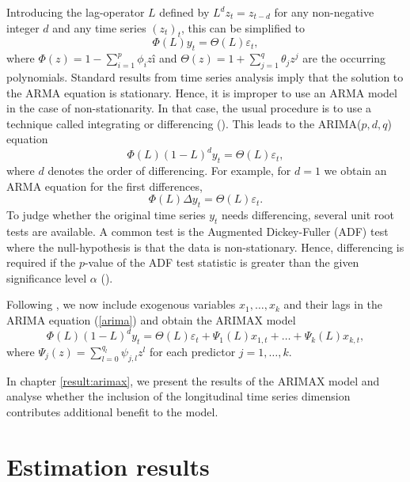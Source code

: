 \documentclass[a4paper, 11pt]{scrreprt}
\begin{document}
Introducing the lag-operator $L$ defined by $L^d z_t = z_{t-d}$ for any non-negative integer $d$ and any time series $(z_t)_t$, this can be simplified to
\begin{equation}
\Phi(L) y_t = \Theta(L) \varepsilon_t,
\end{equation}
where $\Phi(z) = 1 - \sum_{i=1}^p \phi_i zî$ and $\Theta(z) = 1 + \sum_{j=1}^q \theta_j z^j$ are the occurring polynomials.
Standard results from time series analysis imply that the solution to the ARMA equation is stationary. Hence, it is improper to use an ARMA model in the case of non-stationarity. 
In that case, the usual procedure is to use a technique called integrating or differencing (\textcite[chapter 13.1]{kreiss2006zeitreihenanalysis}). This leads to the ARIMA($p,d,q$) equation
\begin{equation}\label{arima}
\Phi(L) (1-L)^d y_t = \Theta(L) \varepsilon_t,
\end{equation}
where $d$ denotes the order of differencing. For example, for $d=1$ we obtain an ARMA equation for the first differences,
\begin{equation}
\Phi(L) \Delta y_t = \Theta(L) \varepsilon_t.
\end{equation}
To judge whether the original time series $y_t$ needs differencing, several unit root tests are available. A common test is the Augmented Dickey-Fuller (ADF) test where the null-hypothesis is that the data is non-stationary. Hence, differencing is required if the $p$-value of the ADF test statistic is greater than the given significance level $\alpha$ (\textcite[chapter 8.1]{hyndman2014forecasting}).

Following \textcite[chapter 2.1]{kongcharoen2013autoregressive}, we now include exogenous variables $x_1, \ldots, x_k$ and their lags in the ARIMA equation (\ref{arima}) and obtain the ARIMAX model
\begin{equation}\label{arimax}
\Phi(L) (1-L)^d y_t = \Theta(L) \varepsilon_t + \Psi_1(L) x_{1,t} + \ldots + \Psi_k(L) x_{k,t},
\end{equation}
where $\Psi_j(z) = \sum_{l=0}^{q_l} \psi_{j,l} z^l$ for each predictor $j=1,\ldots,k$.

In chapter \ref{result:arimax}, we present the results of the ARIMAX model and analyse whether the inclusion of the longitudinal time series dimension contributes additional benefit to the model.



\chapter{Estimation results}\label{result:all}
\end{document}
